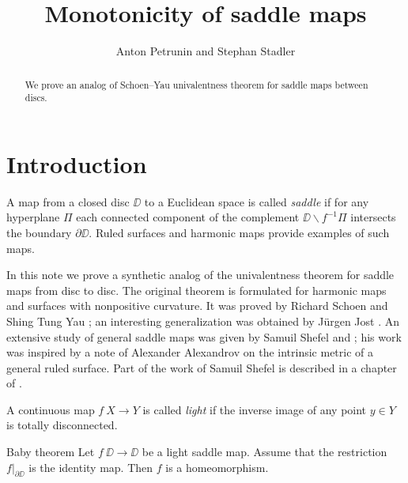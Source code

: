 \documentclass{article}
\begin{document}
\title{Monotonicity of saddle maps}
\author{Anton Petrunin and Stephan Stadler}


\date{}

\maketitle

\begin{abstract}
We prove an analog of Schoen--Yau univalentness theorem for saddle maps between discs.
\end{abstract}

\section{Introduction}

A map from a closed disc $\DD$ to a Euclidean space is called \emph{saddle} if for any hyperplane $\Pi$ each connected component of the 
complement $\DD\backslash f^{-1}\Pi$ intersects the boundary $\partial \DD$.
Ruled surfaces and harmonic maps provide examples of such maps.

In this note we prove a synthetic analog of the univalentness theorem for saddle maps from disc to disc.
The original theorem is formulated for harmonic maps and  surfaces with nonpositive curvature.
It was proved by Richard Schoen and Shing Tung Yau \cite{schoen-yau};
an interesting generalization was obtained by J\"urgen Jost \cite{jost}.
An extensive study of general saddle maps was given by Samuil Shefel \cite{shefel-2D} and \cite{shefel-3D};
his work was inspired by a note of Alexander Alexandrov \cite{A} on the intrinsic metric of a general ruled surface.
Part of the work of Samuil Shefel is described in a chapter of \cite{akp}.

A continuous map $f\:X\to Y$ is called \emph{light} if the inverse image of any point $y\in Y$ is totally disconnected.

\begin{thm}{Baby theorem}\label{baby}
Let $f\:\DD\to \DD$ be a light saddle map.
Assume that 
the restriction $f|_{\partial\DD}$ is the identity map.
Then $f$ is a homeomorphism.
\end{thm}
\end{document}
